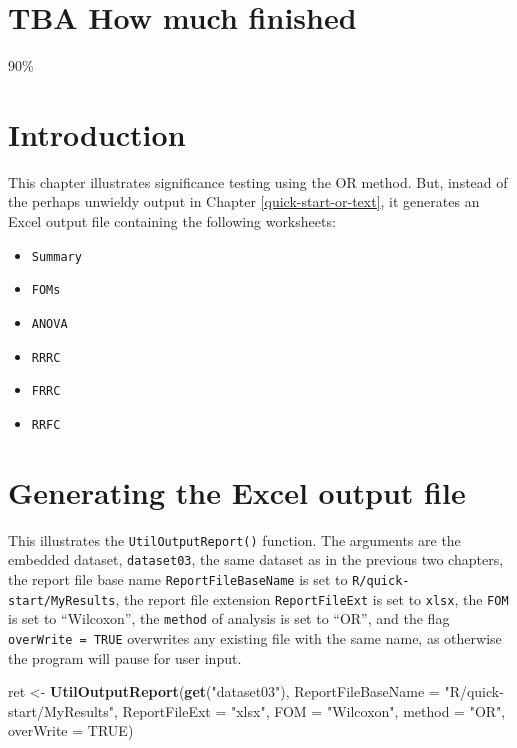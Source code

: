 \documentclass[
]{book}
\newenvironment{Shaded}{\begin{snugshade}}{\end{snugshade}}
\newcommand{\DataTypeTok}[1]{\textcolor[rgb]{0.13,0.29,0.53}{#1}}
\newcommand{\KeywordTok}[1]{\textcolor[rgb]{0.13,0.29,0.53}{\textbf{#1}}}
\newcommand{\NormalTok}[1]{#1}
\newcommand{\OtherTok}[1]{\textcolor[rgb]{0.56,0.35,0.01}{#1}}
\newcommand{\StringTok}[1]{\textcolor[rgb]{0.31,0.60,0.02}{#1}}
\providecommand{\tightlist}{%
  \setlength{\itemsep}{0pt}\setlength{\parskip}{0pt}}
\begin{document}
\hypertarget{quick-start-or-excel-how-much-finished}{%
\section{TBA How much finished}\label{quick-start-or-excel-how-much-finished}}

90\%

\hypertarget{quick-start-or-excel-intro}{%
\section{Introduction}\label{quick-start-or-excel-intro}}

This chapter illustrates significance testing using the OR method. But, instead of the perhaps unwieldy output in Chapter \ref{quick-start-or-text}, it generates an Excel output file containing the following worksheets:

\begin{itemize}
\tightlist
\item
  \texttt{Summary}
\item
  \texttt{FOMs}
\item
  \texttt{ANOVA}
\item
  \texttt{RRRC}
\item
  \texttt{FRRC}
\item
  \texttt{RRFC}
\end{itemize}

\hypertarget{quick-start-or-excel-output}{%
\section{Generating the Excel output file}\label{quick-start-or-excel-output}}

This illustrates the \texttt{UtilOutputReport()} function. The arguments are the embedded dataset, \texttt{dataset03}, the same dataset as in the previous two chapters, the report file base name \texttt{ReportFileBaseName} is set to \texttt{R/quick-start/MyResults}, the report file extension \texttt{ReportFileExt} is set to \texttt{xlsx}, the \texttt{FOM} is set to ``Wilcoxon'', the \texttt{method} of analysis is set to ``OR'', and the flag \texttt{overWrite\ =\ TRUE} overwrites any existing file with the same name, as otherwise the program will pause for user input.

\begin{Shaded}
\begin{Highlighting}[]
\NormalTok{ret <-}\StringTok{ }\KeywordTok{UtilOutputReport}\NormalTok{(}\KeywordTok{get}\NormalTok{(}\StringTok{"dataset03"}\NormalTok{), }
                        \DataTypeTok{ReportFileBaseName =} \StringTok{"R/quick-start/MyResults"}\NormalTok{, }
                        \DataTypeTok{ReportFileExt =} \StringTok{"xlsx"}\NormalTok{,  }
                        \DataTypeTok{FOM =} \StringTok{"Wilcoxon"}\NormalTok{, }
                        \DataTypeTok{method =} \StringTok{"OR"}\NormalTok{, }
                        \DataTypeTok{overWrite =} \OtherTok{TRUE}\NormalTok{)}
\end{Highlighting}
\end{Shaded}
\end{document}

